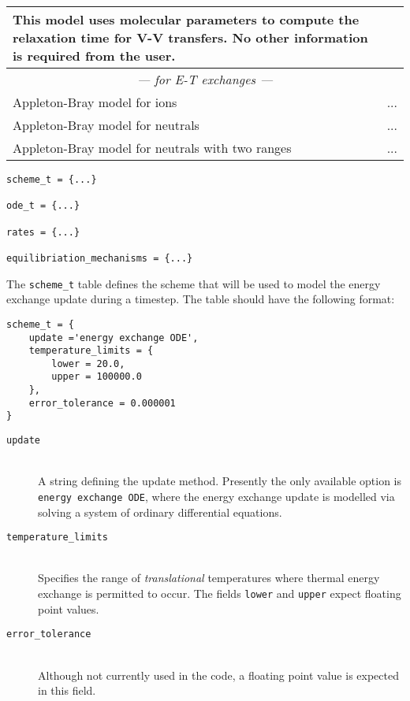 \begin{landscape}
\begin{center}
\begin{longtable}{p{7cm}p{15cm}}
                        This model uses molecular parameters to compute the relaxation time for V-V transfers. No other information is required from the user. \\ \midrule
\multicolumn{2}{c}{\emph{--- for E-T exchanges ---}} \\ \midrule
Appleton-Bray model for ions & ... \\
Appleton-Bray model for neutrals & ... \\
Appleton-Bray model for neutrals with two ranges & ... \\
\bottomrule
\end{longtable}
\end{center}
\end{landscape}


\begin{verbatim}
scheme_t = {...}

ode_t = {...}

rates = {...}

equilibriation_mechanisms = {...}
\end{verbatim}

The \texttt{scheme\_t} table defines the scheme that will be used to model the energy exchange
update during a timestep.
The table should have the following format:

\begin{verbatim}
scheme_t = {
    update ='energy exchange ODE',
    temperature_limits = {
        lower = 20.0,
        upper = 100000.0
    },
    error_tolerance = 0.000001
}
\end{verbatim}

\begin{description}
 \item[\texttt{update}] \hspace{1cm} \\
 A string defining the update method.  Presently the only available option is
 \texttt{energy exchange ODE}, where the energy exchange update is modelled via solving a
 system of ordinary differential equations.
 \item[\texttt{temperature\_limits}] \hspace{1cm} \\
 Specifies the range of \textit{translational} temperatures where thermal energy exchange is 
 permitted to occur.  The fields \texttt{lower} and \texttt{upper} expect floating point values.
 \item[\texttt{error\_tolerance}] \hspace{1cm} \\
 Although not currently used in the code, a floating point value is expected in this field.
\end{description}

